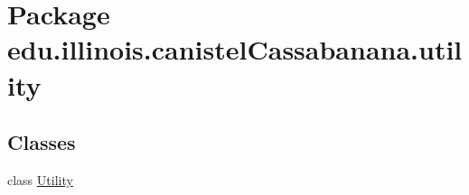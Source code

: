 \hypertarget{namespaceedu_1_1illinois_1_1canistelCassabanana_1_1utility}{
\section{Package edu.illinois.canistelCassabanana.utility}
\label{namespaceedu_1_1illinois_1_1canistelCassabanana_1_1utility}
}
\subsection*{Classes}
\begin{DoxyCompactItemize}
\item 
class \hyperlink{classedu_1_1illinois_1_1canistelCassabanana_1_1utility_1_1Utility}{Utility}
\end{DoxyCompactItemize}
